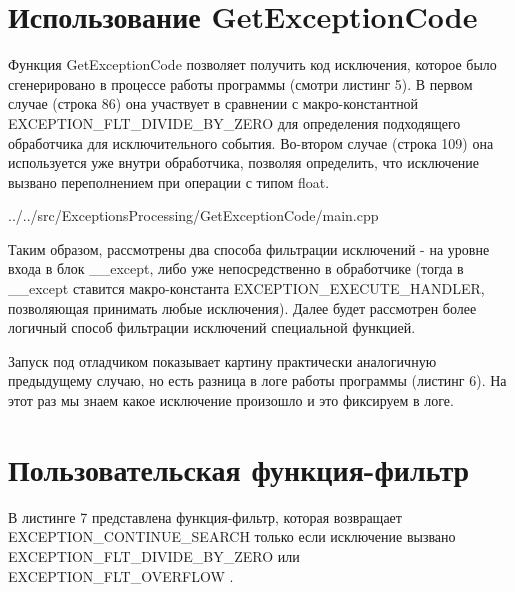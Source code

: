 \documentclass[a4paper, 12pt]{report}		%
\begin{document}

\chapter*{Использование GetExceptionCode}

Функция GetExceptionCode позволяет получить код исключения, которое было сгенерировано в процессе работы программы (смотри листинг 5)\cite{Dushutina}. В первом случае (строка 86) она участвует в сравнении с макро-константной EXCEPTION\_FLT\_DIVIDE\_BY\_ZERO для определения подходящего обработчика для исключительного события. Во-втором случае (строка 109) она используется уже внутри обработчика, позволяя определить, что исключение вызвано переполнением при операции с типом float.


{../../src/ExceptionsProcessing/GetExceptionCode/main.cpp}

Таким образом, рассмотрены два способа фильтрации исключений - на уровне входа в блок \_\_except, либо уже непосредственно в обработчике (тогда в \_\_except ставится макро-константа EXCEPTION\_EXECUTE\_HANDLER, позволяющая принимать любые исключения). Далее будет рассмотрен более логичный способ фильтрации исключений специальной функцией.

Запуск под отладчиком показывает картину практически аналогичную предыдущему случаю, но есть разница в логе работы программы (листинг 6). На этот раз мы знаем какое исключение произошло и это фиксируем в логе.




\chapter*{Пользовательская функция-фильтр}

В листинге 7 представлена функция-фильтр, которая возвращает \\ EXCEPTION\_CONTINUE\_SEARCH только если исключение вызвано \\ EXCEPTION\_FLT\_DIVIDE\_BY\_ZERO или EXCEPTION\_FLT\_OVERFLOW \cite{Dushutina}.
\end{document}
